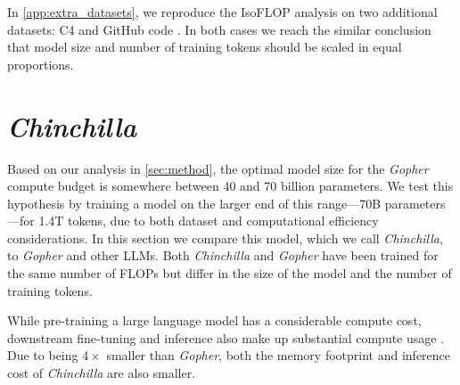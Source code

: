 \documentclass[11pt, a4paper, logo, copyright, nonumbering]{deepmind}
\newcommand{\gopher}{\textit{Gopher}\xspace}
\newcommand{\chinchilla}{\textit{Chinchilla}\xspace}
\begin{document}
In \autoref{app:extra_datasets}, we reproduce the IsoFLOP analysis on two additional datasets: C4 \citep{raffel2019exploring} and GitHub code \citep{rae2021gopher}. 
In both cases we reach the similar conclusion that model size and number of training tokens should be scaled in equal proportions.

\section{\chinchilla}
Based on our analysis in \autoref{sec:method}, the optimal model size for the \gopher compute budget is somewhere between 40 and 70 billion parameters.
We test this hypothesis by training a model on the larger end of this range---70B parameters---for 1.4T tokens, due to both dataset and computational efficiency considerations.
In this section we compare this model, which we call \chinchilla, to \gopher and other LLMs. Both \chinchilla and \gopher have been trained for the same number of FLOPs but differ in the size of the model and the number of training tokens.

While pre-training a large language model has a considerable compute cost, downstream fine-tuning and inference also make up substantial compute usage \citep{rae2021gopher}. 
Due to being $4 \times$ smaller than \gopher, both the memory footprint and inference cost of \chinchilla are also smaller.
\end{document}
